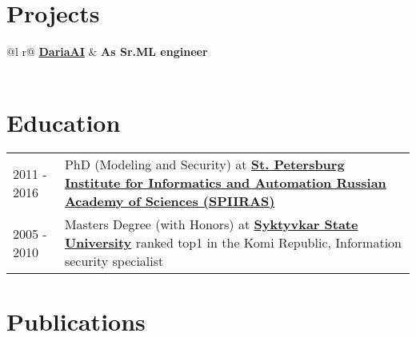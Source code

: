 \documentclass[a4paper,12pt]{article}
\begin{document}
\section{Projects}

\begin{tabularx}{\linewidth}{ @{}l r@{} }
\textbf{\href{https://play.google.com/store/apps/datasafety?id=ru.exhibition.prod}{DariaAI}} & \hfill \textbf{As Sr.ML engineer} \\[3.75pt]
  \\
\end{tabularx}

\section{Education}
\begin{tabularx}{\linewidth}{@{}l X@{}}
2011 - 2016 & PhD (Modeling and Security) at \textbf{\href{http://www.spiiras.nw.ru/en/}{St. Petersburg Institute for Informatics and Automation Russian Academy of Sciences (SPIIRAS)}} \\

2005 - 2010 & Masters Degree (with Honors) at \textbf{\href{https://en.syktsu.ru/}{Syktyvkar State University}} ranked top1 in the Komi Republic, Information security specialist \hfill  \\
\end{tabularx}

\section{Publications}

\begin{refsection}
\nocite{nosal2011modeling, nosal2013justification}
\printbibliography[heading=none]
\end{refsection}
\end{document}
